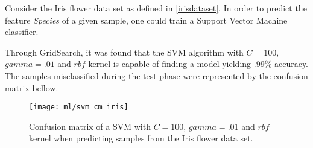 Consider the Iris flower data set as defined in \ref{irisdataset}. In order to predict the feature {\em Species} of a given sample, one could train a Support Vector Machine classifier.

Through GridSearch, it was found that the SVM algorithm with $C=100$, $gamma=.01$ and $rbf$ kernel is capable of finding a model yielding .99\% accuracy. The samples misclassified during the test phase were represented by the confusion matrix bellow.

\begin{figure}[H]
	\centering
	\captionsetup{justification=centering}

	\texttt{[image: ml/svm\_cm\_iris]}
	\caption{Confusion matrix of a SVM with $C=100$, $gamma=.01$ and $rbf$ kernel when predicting samples from the Iris flower data set.}
	\label{fig:cmsvmiris}
\end{figure}
